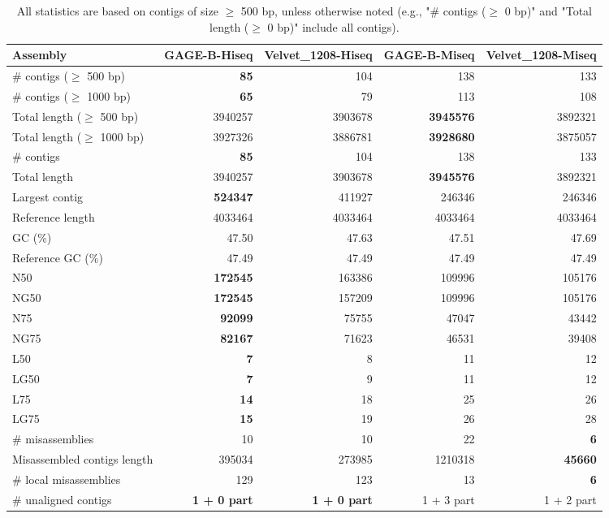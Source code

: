 \documentclass[12pt,a4paper]{article}
\begin{document}
\begin{table}[ht]
\begin{center}
\caption{All statistics are based on contigs of size $\geq$ 500 bp, unless otherwise noted (e.g., "\# contigs ($\geq$ 0 bp)" and "Total length ($\geq$ 0 bp)" include all contigs).}
\begin{tabular}{|l*{4}{|r}|}
\hline
Assembly & GAGE-B-Hiseq & Velvet\_1208-Hiseq & GAGE-B-Miseq & Velvet\_1208-Miseq \\ \hline
\# contigs ($\geq$ 500 bp) & {\bf 85} & 104 & 138 & 133 \\ \hline
\# contigs ($\geq$ 1000 bp) & {\bf 65} & 79 & 113 & 108 \\ \hline
Total length ($\geq$ 500 bp) & 3940257 & 3903678 & {\bf 3945576} & 3892321 \\ \hline
Total length ($\geq$ 1000 bp) & 3927326 & 3886781 & {\bf 3928680} & 3875057 \\ \hline
\# contigs & {\bf 85} & 104 & 138 & 133 \\ \hline
Total length & 3940257 & 3903678 & {\bf 3945576} & 3892321 \\ \hline
Largest contig & {\bf 524347} & 411927 & 246346 & 246346 \\ \hline
Reference length & 4033464 & 4033464 & 4033464 & 4033464 \\ \hline
GC (\%) & 47.50 & 47.63 & 47.51 & 47.69 \\ \hline
Reference GC (\%) & 47.49 & 47.49 & 47.49 & 47.49 \\ \hline
N50 & {\bf 172545} & 163386 & 109996 & 105176 \\ \hline
NG50 & {\bf 172545} & 157209 & 109996 & 105176 \\ \hline
N75 & {\bf 92099} & 75755 & 47047 & 43442 \\ \hline
NG75 & {\bf 82167} & 71623 & 46531 & 39408 \\ \hline
L50 & {\bf 7} & 8 & 11 & 12 \\ \hline
LG50 & {\bf 7} & 9 & 11 & 12 \\ \hline
L75 & {\bf 14} & 18 & 25 & 26 \\ \hline
LG75 & {\bf 15} & 19 & 26 & 28 \\ \hline
\# misassemblies & 10 & 10 & 22 & {\bf 6} \\ \hline
Misassembled contigs length & 395034 & 273985 & 1210318 & {\bf 45660} \\ \hline
\# local misassemblies & 129 & 123 & 13 & {\bf 6} \\ \hline
\# unaligned contigs & {\bf 1 + 0 part} & {\bf 1 + 0 part} & 1 + 3 part & 1 + 2 part \\ \hline

\end{tabular}
\end{center}
\end{table}
\end{document}
